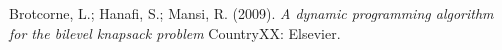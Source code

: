 \documentclass[a4paper, 11pt]{article}
\begin{document}
		\pagebreak
		
		\begin{thebibliography}{9}
		
			 Brotcorne, L.; Hanafi, S.; Mansi, R. (2009). \textit{A dynamic programming algorithm for the bilevel knapsack problem} CountryXX: Elsevier.
	
		\end{thebibliography}
	
	
	
	
\end{document}
